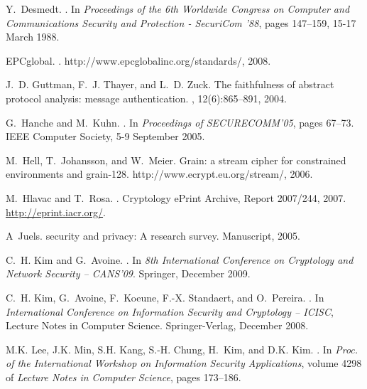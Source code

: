 \documentclass{article}
\begin{document}
\begin{thebibliography}{99}
Y.~Desmedt.
.
\newblock In {\em Proceedings of the 6th Worldwide Congress on Computer and
  Communications Security and Protection - SecuriCom '88}, pages 147--159,
  15-17 March 1988.

EPCglobal.
.
\newblock http://www.epcglobalinc.org/standards/, 2008.

J.~D. Guttman, F.~J. Thayer, and L.~D. Zuck.
\newblock The faithfulness of abstract protocol analysis: message
  authentication.
, 12(6):865--891, 2004.

G.~Hanche and M.~Kuhn.
.
\newblock In {\em Proceedings of SECURECOMM'05}, pages 67--73. IEEE Computer
  Society, 5-9 September 2005.

M.~Hell, T.~Johansson, and W.~Meier.
\newblock Grain: a stream cipher for constrained environments and grain-128.
\newblock http://www.ecrypt.eu.org/stream/, 2006.

M.~Hlavac and T.~Rosa.
.
\newblock Cryptology ePrint Archive, Report 2007/244, 2007.
\newblock \url{http://eprint.iacr.org/}.

A~Juels.
 security and privacy: A research survey.
\newblock Manuscript, 2005.

C.~H. Kim and G.~Avoine.
.
\newblock In {\em 8th International Conference on Cryptology and Network
  Security -- CANS'09}. Springer, December 2009.

C.~H. Kim, G.~Avoine, F.~Koeune, F.-X. Standaert, and O.~Pereira.
.
\newblock In {\em International Conference on Information Security and
  Cryptology -- ICISC}, Lecture Notes in Computer Science. Springer-Verlag,
  December 2008.

M.K. Lee, J.K. Min, S.H. Kang, S.-H. Chung, H.~Kim, and D.K. Kim.
.
\newblock In {\em Proc. of the International Workshop on Information Security
  Applications}, volume 4298 of {\em Lecture Notes in Computer Science}, pages
  173--186.


\end{thebibliography}
\end{document}
